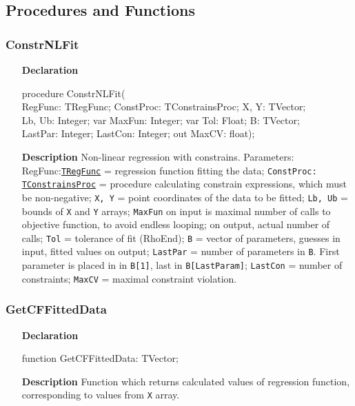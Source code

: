 \documentclass[12pt,a4paper,oneside]{report}
\newcommand{\declarationitem}[1]{\textbf{#1}}
\newcommand{\descriptiontitle}[1]{\textbf{#1}}
\newcommand{\code}[1]{\texttt{#1}}
\begin{document}
\subsection{Procedures and Functions}
\subsubsection{ConstrNLFit}
\label{uconstrnlfit-ConstrNLFit}
\begin{itemize}
	\item[\declarationitem{Declaration}\hfill]
	\begin{flushleft}
	procedure ConstrNLFit(\\
	\hspace{12pt} RegFunc: TRegFunc; ConstProc: TConstrainsProc;  X, Y: TVector; \\
	\hspace{12pt} Lb, Ub: Integer; var MaxFun: Integer; var Tol: Float; B: TVector;\\
	\hspace{12pt} LastPar: Integer; LastCon: Integer; out MaxCV: float);
	\end{flushleft}
	\item[\descriptiontitle{Description}\hfill]
	Non-linear regression with constrains. Parameters: RegFunc:\code{\hyperref[utypes-TRegFunc]{TRegFunc}} = regression function fitting the data; \code{ConstProc: \hyperref[uconstrnlfit:tconstrainsproc]{TConstrainsProc}} = procedure calculating constrain expressions, which must be non-negative; \code{X, Y} = point coordinates of the data to be fitted; \code{Lb, Ub} = bounds of \code{X} and \code{Y} arrays; \code{MaxFun} on input is maximal number of calls to objective function, to avoid endless looping; on output, actual number of calls; \code{Tol} = tolerance of fit (RhoEnd); \code{B} = vector of parameters, guesses in input, fitted values on output; \code{LastPar} = number of parameters in \code{B}. First parameter is placed in in \code{B[1]}, last in \code{B[LastParam]}; \code{LastCon} = number of constraints; \code{MaxCV} = maximal constraint violation.
\end{itemize}
\subsubsection{GetCFFittedData}
\label{uconstrnlfit:GetCFFittedData}
\begin{itemize}
	\item[\declarationitem{Declaration}\hfill]
	\begin{flushleft}
	function GetCFFittedData: TVector;
	\end{flushleft}
	\item[\descriptiontitle{Description}\hfill]
Function which returns calculated values of regression function, corresponding to values from \code{X} array.
\end{itemize}
\end{document}
